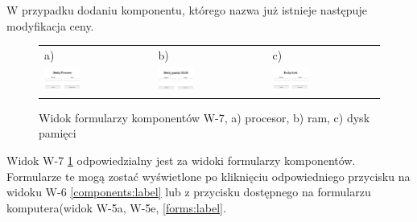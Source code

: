 W przypadku dodaniu komponentu, którego nazwa już istnieje następuje modyfikacja ceny.

\begin{figure}[htb]
  \centering
	\begin{tabular}{@{}lll@{}}
	a) & b) & c) \\
  \includegraphics[width=0.35\textwidth]{rys05/view/addProc.pdf} & 
	\includegraphics[width=0.35\textwidth]{rys05/view/addRam.pdf} &
	\includegraphics[width=0.35\textwidth]{rys05/view/addStorage.pdf}
	\end{tabular}
  \caption{Widok formularzy komponentów W-7, a) procesor, b) ram, c) dysk pamięci}
  \label{compforms:label}
\end{figure}

Widok W-7 \ref{compforms:label} odpowiedzialny jest za widoki formularzy komponentów. Formularze te mogą zostać wyświetlone po kliknięciu odpowiedniego przycisku na widoku W-6 \ref{components:label} lub z przycisku dostępnego na formularzu komputera(widok W-5a, W-5e, \ref{forms:label}.



